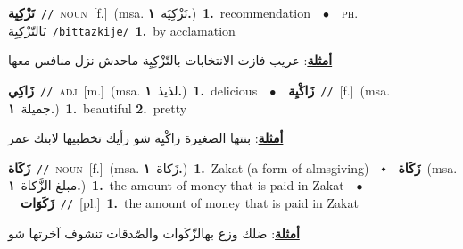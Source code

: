 \documentclass[10pt,a4paper,twoside]{article} %
\begin{document}
\begin{multicols}{2}
{\setlength\topsep{0pt}\textbf{\foreignlanguage{arabic}{تَزْكِيِة}}\ {\color{gray}\texttt{//}\color{black}}\ \textsc{noun}\ [f.]\ \color{gray}(msa. \foreignlanguage{arabic}{تَزْكِيَة}~\foreignlanguage{arabic}{\textbf{١.}})\color{black}\ \textbf{1.}~recommendation\ \ $\bullet$\ \ \textsc{ph.} \color{gray} \foreignlanguage{arabic}{بَالتّزْكِيِة}\color{black}\ {\color{gray}\texttt{/{\sffamily bittazkije}/}\color{black}}\ \textbf{1.}~by acclamation\  \begin{flushright}\color{gray}\foreignlanguage{arabic}{\textbf{\underline{\foreignlanguage{arabic}{أمثلة}}}: عريب فازت الانتخابات بالتّزْكِيِة ماحدش نزل منافس معها}\end{flushright}\color{black}} \vspace{2mm}

{\setlength\topsep{0pt}\textbf{\foreignlanguage{arabic}{زَاكِي}}\ {\color{gray}\texttt{//}\color{black}}\ \textsc{adj}\ [m.]\ \color{gray}(msa. \foreignlanguage{arabic}{لذيذ}~\foreignlanguage{arabic}{\textbf{١.}})\color{black}\ \textbf{1.}~delicious\ \ $\bullet$\ \ \setlength\topsep{0pt}\textbf{\foreignlanguage{arabic}{زَاكْيِة}}\ {\color{gray}\texttt{//}\color{black}}\ [f.]\ \color{gray}(msa. \foreignlanguage{arabic}{جميلة}~\foreignlanguage{arabic}{\textbf{١.}})\color{black}\ \textbf{1.}~beautiful  \textbf{2.}~pretty\  \begin{flushright}\color{gray}\foreignlanguage{arabic}{\textbf{\underline{\foreignlanguage{arabic}{أمثلة}}}: بنتها الصغيرة زاكْيِة شو رأيك تخطبيها لابنك عمر}\end{flushright}\color{black}} \vspace{2mm}

{\setlength\topsep{0pt}\textbf{\foreignlanguage{arabic}{زَكَاة}}\ {\color{gray}\texttt{//}\color{black}}\ \textsc{noun}\ [f.]\ \color{gray}(msa. \foreignlanguage{arabic}{زَكاة}~\foreignlanguage{arabic}{\textbf{١.}})\color{black}\ \textbf{1.}~Zakat (a form of almsgiving)\ \ $\smblkdiamond$\ \ \setlength\topsep{0pt}\textbf{\foreignlanguage{arabic}{زَكَاة}}\ \color{gray}(msa. \foreignlanguage{arabic}{مبلغ الزَّكاة}~\foreignlanguage{arabic}{\textbf{١.}})\color{black}\ \textbf{1.}~the amount of money that is paid in Zakat\ \ $\bullet$\ \ \setlength\topsep{0pt}\textbf{\foreignlanguage{arabic}{زَكَوَات}}\ {\color{gray}\texttt{//}\color{black}}\ [pl.]\ \textbf{1.}~the amount of money that is paid in Zakat\  \begin{flushright}\color{gray}\foreignlanguage{arabic}{\textbf{\underline{\foreignlanguage{arabic}{أمثلة}}}: ضلك وزع بهالزّكَوات والصّدقات تنشوف آخرتها شو}\end{flushright}\color{black}} \vspace{2mm}


\end{multicols}
\end{document}
